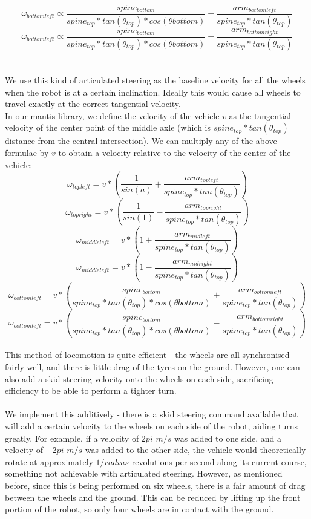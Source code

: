 \documentclass[]{article}
\begin{document}
\[ \omega_{bottomleft} \propto \frac{spine_{bottom}}{spine_{top} * tan(\theta_{top}) * cos(\theta{bottom})} + \frac{arm_{bottomleft}}{spine_{top} * tan(\theta_{top})} \]
\[ \omega_{bottomleft} \propto \frac{spine_{bottom}}{spine_{top} * tan(\theta_{top}) * cos(\theta{bottom})} - \frac{arm_{bottomright}}{spine_{top} * tan(\theta_{top})} \]
\\
\\
We use this kind of articulated steering as the baseline velocity for all the wheels when the robot is at a certain inclination. Ideally this would cause all wheels to travel exactly at the correct tangential velocity.
\\
In our mantis library, we define the velocity of the vehicle $v$ as the tangential velocity of the center point of the middle axle (which is $spine_{top} * tan(\theta_{top})$ distance from the central intersection). We can multiply any of the above formulae by $v$ to obtain a velocity relative to the velocity of the center of the vehicle:
\\
\[ \omega_{topleft} = v * (\frac{1}{sin(a)} + \frac{arm_{topleft}}{spine_{top} * tan(\theta_{top})}) \]
\[ \omega_{topright} = v * (\frac{1}{sin(1)} - \frac{arm_{topright}}{spine_{top} * tan(\theta_{top})}) \]
\[ \omega_{middleleft} = v * (1 + \frac{arm_{midleft}}{spine_{top} * tan(\theta_{top})}) \]
\[ \omega_{middleleft} = v * (1 - \frac{arm_{midright}}{spine_{top} * tan(\theta_{top})}) \]
\[ \omega_{bottomleft} = v * (\frac{spine_{bottom}}{spine_{top} * tan(\theta_{top}) * cos(\theta{bottom})} + \frac{arm_{bottomleft}}{spine_{top} * tan(\theta_{top})}) \]
\[ \omega_{bottomleft} = v * (\frac{spine_{bottom}}{spine_{top} * tan(\theta_{top}) * cos(\theta{bottom})} - \frac{arm_{bottomright}}{spine_{top} * tan(\theta_{top})}) \]
\\
This method of locomotion is quite efficient - the wheels are all synchronised fairly well, and there is little drag of the tyres on the ground. However, one can also add a skid steering velocity onto the wheels on each side, sacrificing efficiency to be able to perform a tighter turn.
\\
\\
We implement this additively - there is a skid steering command available that will add a certain velocity to the wheels on each side of the robot, aiding turns greatly. For example, if a velocity of $2pi$ $m/s$ was added to one side, and a velocity of $-2pi$ $m/s$ was added to the other side, the vehicle would theoretically rotate at approximately $1 / radius$ revolutions per second along its current course, something not achievable with articulated steering. However, as mentioned before, since this is being performed on six wheels, there is a fair amount of drag between the wheels and the ground. This can be reduced by lifting up the front portion of the robot, so only four wheels are in contact with the ground.
\end{document}
